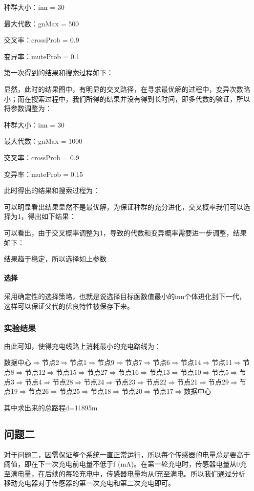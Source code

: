 \documentclass{article}
\begin{document}
种群大小：inn = 30

最大代数：gnMax = 500

交叉率：crossProb = 0.9

变异率：muteProb = 0.1

第一次得到的结果和搜索过程如下：


显然，此时的结果图中，有明显的交叉路径，在寻求最优解的过程中，变异次数略小；而在搜索过程中，我们所得的结果并没有得到长时间，即多代数的验证，所以将参数调整为：

种群大小：inn = 30

最大代数：gnMax = 1000

交叉率：crossProb = 0.9

变异率：muteProb = 0.15

此时得出的结果和搜索过程为：


可以明显看出结果显然不是最优解，为保证种群的充分进化，交叉概率我们可以选择为1，得出如下结果： 



可以看出，由于交叉概率调整为1，导致的代数和变异概率需要进一步调整，结果如下：


结果趋于稳定，所以选择如上参数
\paragraph{选择}
采用确定性的选择策略，也就是说选择目标函数值最小的inn个体进化到下一代，这样可以保证父代的优良特性被保存下来。
\subsubsection{实验结果}
由此可知，使得充电线路上消耗最小的充电路线为：

\vspace{2ex}
\noindent 数据中心$\Rightarrow$节点2\;$\Rightarrow$节点1\;$\Rightarrow$节点9\;$\Rightarrow$节点7\;$\Rightarrow$节点6\;$\Rightarrow$节点14\;$\Rightarrow$节点11\;$\Rightarrow$节点8\;$\Rightarrow$节点12\;$\Rightarrow$节点15\;$\Rightarrow$节点27\;$\Rightarrow$节点16\;$\Rightarrow$节点13\;$\Rightarrow$节点10\;$\Rightarrow$节点5\;$\Rightarrow$节点3\;$\Rightarrow$节点4\;$\Rightarrow$节点28\;$\Rightarrow$节点24\;$\Rightarrow$节点23\;$\Rightarrow$节点22\;$\Rightarrow$节点21$\Rightarrow$节点29\;$\Rightarrow$节点19\;$\Rightarrow$节点26\;$\Rightarrow$节点25\;$\Rightarrow$节点18\;$\Rightarrow$节点20\;$\Rightarrow$节点17\;$\Rightarrow$数据中心
\vspace{2ex}

其中求出来的总路程d=11895m

\subsection{问题二}
对于问题二，因需保证整个系统一直正常运行，所以每个传感器的电量总是要高于阈值，即在下一次充电前电量不低于f (mA)。在第一轮充电时，传感器电量从0充至满电量，在后续的每轮充电中，传感器电量均从f充至满电。所以我们通过分析移动充电器对于传感器的第一次充电和第二次充电即可。
\end{document}
